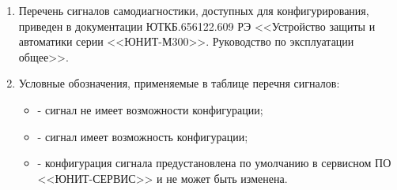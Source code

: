 \begin{landscape}

\setlength{\headsep}{7.5mm} 
\setlength{\topmargin}{-27mm}
\setlength{\footskip}{0mm}

\color{black}

\begin{enumerate}[label=\ref{app:signals}.\arabic*] %
  \item Перечень сигналов самодиагностики, доступных для конфигурирования, приведен в документации ЮТКБ.656122.609 РЭ <<Устройство защиты и автоматики серии <<ЮНИТ-М300>>. Руководство по эксплуатации общее>>.
  \item Условные обозначения, применяемые в таблице перечня сигналов:
  \begin{itemize}
    \item[$\text{(--)}$] { - сигнал не имеет возможности конфигурации;}
    \item[$\text{(+)}$] { - сигнал имеет возможность конфигурации;}
    \item[$\text{(*)}$] { - конфигурация сигнала предустановлена по умолчанию в сервисном ПО <<ЮНИТ-СЕРВИС>> и не может быть изменена.}
  \end{itemize}
\end{enumerate}

\small %
\begin{longtable}{
>{\centering\arraybackslash}m{6.2cm}
|>{\centering\arraybackslash}m{3.7cm}
|>{\centering\arraybackslash}m{2cm}
|>{\centering\arraybackslash}m{2cm}
|>{\centering\arraybackslash}m{2cm}
|>{\centering\arraybackslash}m{2cm}
|>{\centering\arraybackslash}m{2cm}
|>{\centering\arraybackslash}m{2cm}
|>{\centering\arraybackslash}m{2.1cm}
}


\end{longtable}
\end{landscape}
